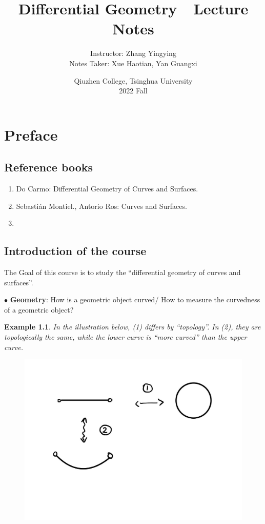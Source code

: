 \documentclass[UTF8,oneside,11pt]{book}
\title{
    \huge{Differential Geometry~~Lecture Notes}
    \vspace{0.4\paperheight}
}
\author{
    \Large{Instructor: Zhang Yingying}\\
    \Large{Notes Taker: Xue Haotian, Yan Guangxi}
    \vspace{0.1\paperheight}
}
\date{
    \Large{Qiuzhen College, Tsinghua University}\\
    \Large{2022 Fall}
}
\theoremstyle{plain}\newtheorem{thm}{Theorem}
\theoremstyle{definition}\newtheorem{defn}[thm]{Definition}
\theoremstyle{plain}\newtheorem{axiom}[thm]{Axiom}
\theoremstyle{plain}\newtheorem{coro}[thm]{Corollary}
\theoremstyle{plain}\newtheorem{lemma}[thm]{Lemma}
\theoremstyle{plain}\newtheorem{prop}[thm]{Proposition}
\theoremstyle{plain}\newtheorem{conj}[thm]{Conjecture}
\theoremstyle{plain}\newtheorem{ques}[thm]{Problem}
\theoremstyle{plain}\newtheorem{const}[thm]{Construction}
\theoremstyle{remark}\newtheorem{notation}[thm]{Notation}
\theoremstyle{plain}\newtheorem*{app}{Application}
\theoremstyle{plain}\newtheorem*{exam}{Example}
\theoremstyle{plain}\newtheorem*{exer}{Exercise}
\theoremstyle{remark}\newtheorem*{remark}{Remark}
\theoremstyle{remark}\newtheorem*{note}{\small{Note}}
\numberwithin{equation}{section}
\numberwithin{thm}{section}
\begin{document}
\maketitle
\frontmatter
\chapter{\centering Preface}
\section*{Reference books}
\begin{enumerate}[(1)]
    \item Do Carmo: Differential Geometry of Curves and Surfaces.
    \item Sebasti\'an Montiel., Antorio Ros: Curves and Surfaces.
    \item ~
\end{enumerate}
\section*{Introduction of the course}
The Goal of this course is to study the ``differential geometry of curves and surfaces''.\par
$\bullet$ \textbf{Geometry}: How is a geometric object curved/ How to measure the curvedness of a geometric object? 
\begin{exam}
     In the illustration below, (1) differs by ``topology''. In (2), they are topologically the same, while the lower curve is ``more curved'' than the upper curve.
\end{exam}

\begin{figure}[H]\centering
    \includegraphics[scale=0.3]{picture/preface_example1.jpg}
\end{figure}
\end{document}
